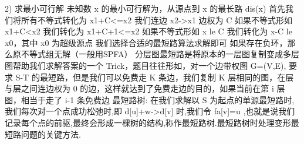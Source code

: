 {}\markdownRendererDollarSign{} 2) \markdownRendererDollarSign{}求最小可行解\markdownRendererParagraphSeparator
{}未知数\markdownRendererDollarSign{} x \markdownRendererDollarSign{}的最小可行解为，从源点到\markdownRendererDollarSign{} x \markdownRendererDollarSign{}的最长路\markdownRendererDollarSign{} dis(x) \markdownRendererDollarSign{}\markdownRendererParagraphSeparator
{}首先我们将所有不等式转化为\markdownRendererDollarSign{} x1+C<=x2 \markdownRendererDollarSign{} 我们连边\markdownRendererDollarSign{} x2->x1 \markdownRendererDollarSign{} 边权为\markdownRendererDollarSign{} C \markdownRendererDollarSign{}\markdownRendererParagraphSeparator
{}如果不等式形如\markdownRendererDollarSign{} x1+C<x2 \markdownRendererDollarSign{} 我们转化为\markdownRendererDollarSign{} x1+C+1<=x2 \markdownRendererDollarSign{}\markdownRendererParagraphSeparator
{}如果不等式形如 \markdownRendererDollarSign{}x \markdownRendererBackslash{}le C\markdownRendererDollarSign{} 我们转化为 \markdownRendererDollarSign{}x-C \markdownRendererBackslash{}le x\markdownRendererUnderscore{}0\markdownRendererDollarSign{}，其中 \markdownRendererDollarSign{}x\markdownRendererUnderscore{}0\markdownRendererDollarSign{} 为超级源点\markdownRendererParagraphSeparator
{}我们选择合适的最短路算法求解即可 如果存在负环，那么原不等式组无解（一般用SPFA）\markdownRendererInterblockSeparator
{}
\markdownRendererSectionEnd \markdownRendererSectionBegin
{}\markdownRendererInterblockSeparator
{}分层图最短路是将原本的一层图复制变成多层图帮助我们求解答案的一个 \markdownRendererDollarSign{}Trick\markdownRendererDollarSign{}，题目往往形如，对一个边带权图 \markdownRendererDollarSign{}G=(V,E)\markdownRendererDollarSign{}, 要求 \markdownRendererDollarSign{}S-T\markdownRendererDollarSign{} 的最短路，但是我们可以免费走 \markdownRendererDollarSign{}K\markdownRendererDollarSign{} 条边，我们复制 \markdownRendererDollarSign{}K\markdownRendererDollarSign{} 层相同的图，在层与层之间连边权为 \markdownRendererDollarSign{}0\markdownRendererDollarSign{} 的边，这样就达到了免费走边的目的，如果当前在第 \markdownRendererDollarSign{}i\markdownRendererDollarSign{} 层图，相当于走了 \markdownRendererDollarSign{}i-1\markdownRendererDollarSign{} 条免费边\markdownRendererInterblockSeparator
{}
\markdownRendererSectionEnd \markdownRendererSectionBegin
{}\markdownRendererInterblockSeparator
{}最短路树:\markdownRendererParagraphSeparator
{}在我们求解以\markdownRendererDollarSign{} S \markdownRendererDollarSign{}为起点的单源最短路时,我们每次对一个点成功松弛时,即\markdownRendererDollarSign{} d[u]+w->d[v] \markdownRendererDollarSign{}时,我们令\markdownRendererDollarSign{} fa[v]=u \markdownRendererDollarSign{},也就是说我们记录每个点的前驱,最终会形成一棵树的结构,称作最短路树.最短路树时处理变形最短路问题的关键方法.\markdownRendererParagraphSeparator
